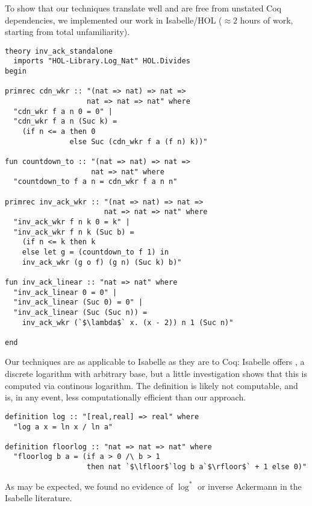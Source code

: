 To show that our techniques translate well and 
are free from unstated Coq dependencies, 
we implemented our work in Isabelle/HOL
($\approx 2$ hours of work, starting from total unfamiliarity).
\lstset{style=isaStyle}
\begin{lstlisting}
theory inv_ack_standalone
  imports "HOL-Library.Log_Nat" HOL.Divides
begin

primrec cdn_wkr :: "(nat => nat) => nat => 
                   nat => nat => nat" where
  "cdn_wkr f a n 0 = 0" |
  "cdn_wkr f a n (Suc k) = 
    (if n <= a then 0 
  	           else Suc (cdn_wkr f a (f n) k))"

fun countdown_to :: "(nat => nat) => nat => 
                    nat => nat" where
  "countdown_to f a n = cdn_wkr f a n n"

primrec inv_ack_wkr :: "(nat => nat) => nat => 
                       nat => nat => nat" where
  "inv_ack_wkr f n k 0 = k" |
  "inv_ack_wkr f n k (Suc b) = 
  	(if n <= k then k
  	else let g = (countdown_to f 1) in
    inv_ack_wkr (g o f) (g n) (Suc k) b)"

fun inv_ack_linear :: "nat => nat" where
  "inv_ack_linear 0 = 0" |
  "inv_ack_linear (Suc 0) = 0" |
  "inv_ack_linear (Suc (Suc n)) = 
  	inv_ack_wkr (`$\lambda$` x. (x - 2)) n 1 (Suc n)"
 
end
\end{lstlisting}
\lstset{style=myStyle}

\noindent Our techniques are as applicable to Isabelle as they are to Coq:
Isabelle offers , a discrete logarithm with arbitrary base, but 
a little investigation shows that this is computed via continous logarithm.
The definition is likely not computable, and is, in any event, 
less computationally efficient than our approach. 

\begin{lstlisting}
definition log :: "[real,real] => real" where
  "log a x = ln x / ln a"

definition floorlog :: "nat => nat => nat" where
  "floorlog b a = (if a > 0 /\ b > 1 
                   then nat `$\lfloor$`log b a`$\rfloor$` + 1 else 0)"
\end{lstlisting}

\noindent As may be expected, we found no evidence of $\log^*$ or inverse Ackermann
in the Isabelle literature.

